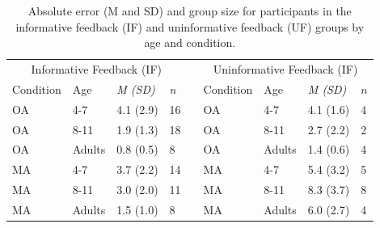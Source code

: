 \documentclass[a4paper,man,natbib,floatsintext,noextraspace]{apa6}
\begin{document}
\begin{table}
\caption{Absolute error (M and SD) and group size for participants in the informative feedback (IF) and uninformative feedback (UF) groups by age and condition.}
\label{tab:1}
\begin{tabular}{@{}lllllllll@{}}
\multicolumn{4}{c}{Informative Feedback (IF)}                                                                                   &                       & \multicolumn{4}{c}{Uninformative Feedback (IF)}                                                                  \\ 
\multicolumn{1}{l}{Condition} & \multicolumn{1}{l}{Age} & \multicolumn{1}{l}{\textit{M (SD)}} & \multicolumn{1}{l}{\textit{n}} & \multicolumn{1}{l}{} & \multicolumn{1}{l}{Condition} & \multicolumn{1}{l}{Age} & \multicolumn{1}{l}{\textit{M (SD)}} & \multicolumn{1}{l}{$n$} \\ \midrule
OA                              & 4-7                      & 4.1 (2.9)                            & 16                              &                       & OA                             & 4-7                      & 4.1 (1.6)                   & 4                      \\
OA                              & 8-11                     & 1.9 (1.3)                            & 18                              &                       & OA                             & 8-11                     & 2.7 (2.2)                   & 2                      \\
OA                              & Adults                   & 0.8 (0.5)                            & 8                               &                       & OA                             & Adults                   & 1.4 (0.6)                   & 4                      \\
MA                              & 4-7                      & 3.7 (2.2)                            & 14                              &                       & MA                             & 4-7                      & 5.4 (3.2)                   & 5                      \\
MA                              & 8-11                     & 3.0 (2.0)                            & 11                              &                       & MA                             & 8-11                     & 8.3 (3.7)                   & 8                      \\
MA                              & Adults                   & 1.5 (1.0)                            & 8                               &                       & MA                             & Adults                   & 6.0 (2.7)                   & 4                      \\ \bottomrule
\end{tabular}
\end{table}
\end{document}
